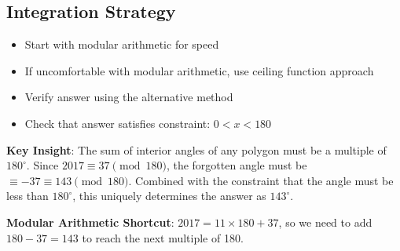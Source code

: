 \documentclass[]{article}
\begin{document}
\begin{techniquesbox}
\subsection*{Integration Strategy}
\begin{itemize}[leftmargin=*]
    \item Start with modular arithmetic for speed
    \item If uncomfortable with modular arithmetic, use ceiling function approach
    \item Verify answer using the alternative method
    \item Check that answer satisfies constraint: $0 < x < 180$
\end{itemize}
\end{techniquesbox}

\begin{keyinsightbox}
\textbf{Key Insight}: The sum of interior angles of any polygon must be a multiple of $180^\circ$. Since $2017 \equiv 37 \pmod{180}$, the forgotten angle must be $\equiv -37 \equiv 143 \pmod{180}$. Combined with the constraint that the angle must be less than $180^\circ$, this uniquely determines the answer as $143^\circ$.

\textbf{Modular Arithmetic Shortcut}: $2017 = 11 \times 180 + 37$, so we need to add $180 - 37 = 143$ to reach the next multiple of 180.
\end{keyinsightbox}
\end{document}
